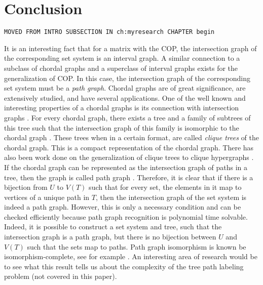 \xclearpage

\chapter{Conclusion}
\label{ch:conclusion}

%



\begin{center} {\tt MOVED FROM INTRO SUBSECTION IN ch:myresearch
    CHAPTER begin}
\end{center}

It is an interesting fact that for a matrix with the COP, the
intersection graph of the corresponding set system is an interval
graph. %
A similar connection to a subclass of chordal graphs and a superclass
of interval graphs exists for the generalization of COP.  In this
case, the intersection graph of the corresponding set system must be a
{\em path graph}. Chordal graphs are of great significance, are
extensively studied, and have several applications.  One of the well
known and interesting properties of a chordal graphs is its connection
with intersection graphs \cite{mcg04}. For every chordal graph, there
exists a tree and a family of subtrees of this tree such that the
intersection graph of this family is isomorphic to the chordal graph
\cite{plr70,gav78,bp93}.  These trees when in a certain format, are
called {\em clique trees} \cite{apy92} of the chordal graph. This is a
compact representation of the chordal graph. There has also been work
done on the generalization of clique trees to clique hypergraphs
\cite{km02}.  If the chordal graph can be represented as the
intersection graph of paths in a tree, then the graph is called path
graph \cite{mcg04}.  Therefore, it is clear that if there is a
bijection from $U$ to $V(T)$ such that for every set, the elements in
it map to vertices of a unique path in $T$, then the intersection
graph of the set system is indeed a path graph.  However, this is only
a necessary condition and can be checked efficiently because path
graph recognition is polynomial time
solvable\cite{gav78,aas93}. Indeed, it is possible to construct a set
system and tree, such that the intersection graph is a path graph, but
there is no bijection between $U$ and $V(T)$ such that the sets map to
paths. Path graph isomorphism is known be isomorphism-complete, see
for example \cite{kklv10}. An interesting area of research would be to
see what this result tells us about the complexity of the tree path
labeling problem (not covered in this paper).

